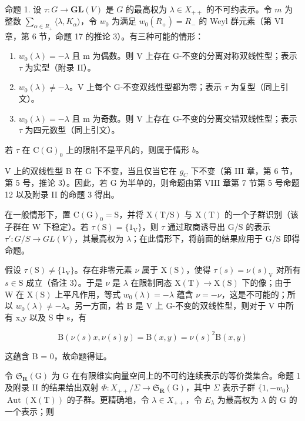 命题 1. 设 \(\tau : G \to \mathbf{GL}(V)\) 是 \(G\) 的最高权为 \(\lambda \in X_{++}\) 的不可约表示。令 \(m\) 为整数 \(\sum_{\alpha \in R_+} \langle \lambda, K_\alpha \rangle\)，令 \(w_0\) 为满足 \(w_0(R_+) = R_-\) 的 Weyl 群元素（第 VI 章，第 6 节，命题 17 的推论 3）。有三种可能的情形：

\begin{enumerate}
\def\labelenumi{\alph{enumi})}
\item
  \(w_{0}(\lambda) = -\lambda\) 且 m 为偶数。则 V 上存在 G-不变的分离对称双线性型；表示 \(\tau\) 为实型（附录 II）。
\item
  \(w_{0}(\lambda) \neq -\lambda\)。V 上每个 G-不变双线性型都为零；表示 \(\tau\) 为复型（同上引文）。
\item
  \(w_{0}(\lambda) = -\lambda\) 且 m 为奇数。则 V 上存在 G-不变的分离交错双线性型；表示 \(\tau\) 为四元数型（同上引文）。
\end{enumerate}

若 \(\tau\) 在 \(\mathrm{C}(\mathrm{G})_0\) 上的限制不是平凡的，则属于情形 \(b\)。

V 上的双线性型 B 在 G 下不变，当且仅当它在 \(g_{C}\) 下不变（第 III 章，第 6 节，第 5 号，推论 3）。因此，若 G 为半单的，则命题由第 VIII 章第 7 节第 5 号命题 12 以及附录 II 的命题 3 得出。

在一般情形下，置 \(\mathrm{C}(\mathrm{G})_{0} = \mathrm{S}\)，并将 \(\mathrm{X}(\mathrm{T}/\mathrm{S})\) 与 \(\mathrm{X}(\mathrm{T})\) 的一个子群识别（该子群在 W 下稳定）。若 \(\tau(\mathrm{S}) = \{1_{\mathrm{V}}\}\)，则 \(\tau\) 通过取商诱导出 G/S 的表示 \(\tau' : G/S \to GL(V)\)，其最高权为 \(\lambda\)；在此情形下，将前面的结果应用于 G/S 即得命题。

假设 \(\tau (\mathrm{S})\neq \{1_{\mathrm{V}}\}\)。存在非零元素 \(\nu\) 属于 \(\mathrm{X(S)}\)，使得 \(\tau (s) = \nu (s)_{\mathrm{V}}\) 对所有 \(s\in \mathrm{S}\) 成立（备注 3）。于是 \(\nu\) 是 \(\lambda\) 在限制同态 \(\mathrm{X}(\mathrm{T})\to\mathrm{X}(\mathrm{S})\) 下的像；由于 W 在 \(\mathrm{X}(\mathrm{S})\) 上平凡作用，等式 \(w_{0}(\lambda)=-\lambda\) 蕴含 \(\nu=-\nu\)，这是不可能的；所以 \(w_{0}(\lambda)\neq-\lambda\)。另一方面，若 B 是 V 上 G-不变的双线性型，则对于 V 中所有 x,y 以及 S 中 s，有

\[
\mathrm{B} (\nu (s) x, \nu (s) y) = \mathrm{B} (x, y) = \nu (s) ^ {2} \mathrm{B} (x, y)
\]

这蕴含 B = 0，故命题得证。

令 \(\mathfrak{S}_{\mathbf{R}}(\mathrm{G})\) 为 G 在有限维实向量空间上的不可约连续表示的等价类集合。命题 1 及附录 II 的结果给出双射 \(\Phi:X_{++}/\Sigma\to\mathfrak{S}_{\mathbf{R}}(\mathrm{G})\)，其中 \(\Sigma\) 表示子群 \(\{1,-w_{0}\}\) \(\operatorname{Aut}(\mathrm{X}(\mathrm{T}))\) 的子群。更精确地，令 \(\lambda\in X_{++}\)，令 \(E_{\lambda}\) 为最高权为 \(\lambda\) 的 G 的一个表示；则

